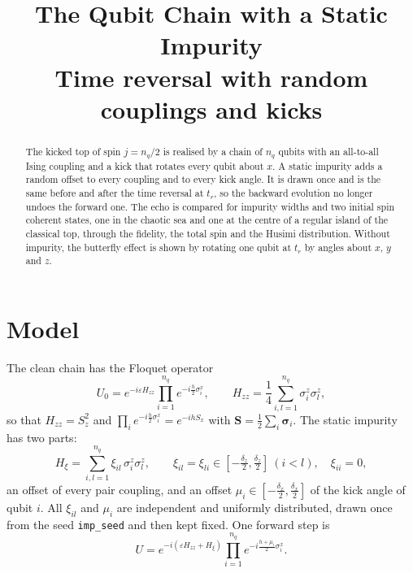 \documentclass[11pt,a4paper]{article}
\title{The Qubit Chain with a Static Impurity\\[0.3em]
  \large Time reversal with random couplings and kicks}
\author{}
\date{}
\begin{document}
\maketitle

\begin{abstract}
The kicked top of spin $j=n_q/2$ is realised by a chain of $n_q$ qubits with an all-to-all Ising coupling and a
kick that rotates every qubit about $x$. A static impurity adds a random offset to every coupling and to every kick
angle. It is drawn once and is the same before and after the time reversal at $t_r$, so the backward evolution no
longer undoes the forward one. The echo is compared for \nruns{} impurity widths and two initial spin coherent states, one in the chaotic sea and one at the centre of a regular island
of the classical top, through the fidelity,
the total spin and the Husimi distribution. Without impurity, the butterfly effect is shown by rotating one qubit at
$t_r$ by \nalpha{} angles about $x$, $y$ and $z$.
\end{abstract}

\section{Model}\label{sec:model}

The clean chain has the Floquet operator
\begin{equation}\label{eq:U0}
  U_0 = e^{-i\varepsilon H_{zz}}\prod_{i=1}^{n_q} e^{-i\frac{h}{2}\sigma^x_i},\qquad
  H_{zz} = \frac14\sum_{i,l=1}^{n_q}\sigma^z_i\sigma^z_l,
\end{equation}
so that $H_{zz}=S_z^2$ and $\prod_i e^{-i\frac h2\sigma^x_i}=e^{-ihS_x}$ with $\bm S=\frac12\sum_i\bm\sigma_i$.
The static impurity has two parts:
\begin{equation}\label{eq:imp}
  H_\xi = \sum_{i,l=1}^{n_q}\xi_{il}\,\sigma^z_i\sigma^z_l,\qquad
  \xi_{il}=\xi_{li}\in\left[-\tfrac{\delta_z}{2},\tfrac{\delta_z}{2}\right]\ (i<l),\quad \xi_{ii}=0,
\end{equation}
an offset of every pair coupling, and an offset $\mu_i\in[-\frac{\delta_x}{2},\frac{\delta_x}{2}]$ of the kick
angle of qubit $i$. All $\xi_{il}$ and $\mu_i$ are independent and uniformly distributed, drawn once from the seed
\texttt{imp\_seed} and then kept fixed. One forward step is
\begin{equation}\label{eq:U}
  U = e^{-i(\varepsilon H_{zz}+H_\xi)}\prod_{i=1}^{n_q} e^{-i\frac{h+\mu_i}{2}\sigma^x_i}.
\end{equation}
\end{document}
